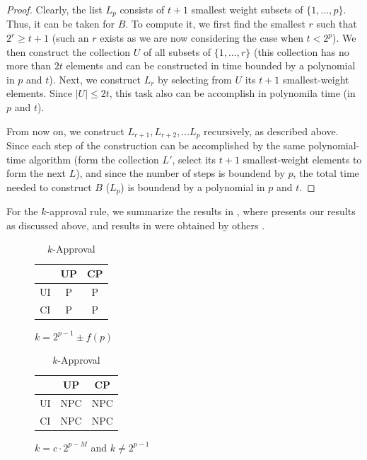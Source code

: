 \begin{proof}
Clearly, the list $L_p$ consists of $t+1$ smallest weight subsets of
$\{1,\ldots,p\}$. Thus, it can be taken for $B$. To compute it, we first
find the smallest $r$ such that $2^r\geq t+1$ (such an $r$ exists as
we are now considering the case when $t < 2^p$). We then construct the 
collection $U$ of all subsets of $\{1,\ldots, r\}$ (this collection 
has no more than $2t$ elements and can be constructed in time bounded 
by a polynomial in $p$ and $t$). Next, we construct $L_r$ by selecting 
from $U$ its $t+1$ smallest-weight elements. Since $|U|\leq 2t$, this task
also can be accomplish in polynomila time (in $p$ and $t$).

From now on, we construct $L_{r+1},L_{r+2},\ldots L_p$ recursively, as 
described above. Since each step of the construction can be accomplished
by the same polynomial-time algorithm (form the collection $L'$, select
its $t+1$ smallest-weight elements to form the next $L$), and since
the number of steps is boundend by $p$, the total time needed to construct
$B$ ($L_p$) is boundend by a polynomial in $p$ and $t$.  
\end{proof}


For the $k$-approval rule, we summarize the results in ,
where  presents our results as discussed above,
and results in  were obtained by others
\cite{lang:aggLP}.
\begin{table}
	\centering
  \begin{subfigure}[b]{0.5\textwidth}
		\centering
		\begin{tabular}[0.5\textwidth]{ | c | c | c | }
		  \hline
		    & UP & CP \\
		  \hline
		  UI & P & P \\
		  \hline
		  CI & P & P \\
		  \hline
		\end{tabular}
		\caption{$k=2^{p-1}\pm f(p)$}
		\label{tbl:kApp_comp_a}
	\end{subfigure}%
  \begin{subfigure}[b]{0.5\textwidth}
		\centering
		\begin{tabular}[0.5\textwidth]{ | c | c | c | }
		  \hline
		    & UP & CP \\
		  \hline
		  UI & NPC & NPC \\
		  \hline
		  CI & NPC & NPC \\
		  \hline
		\end{tabular}
		\caption{$k=c\cdot 2^{p-M}$ and $k \not = 2^{p-1}$}
		\label{tbl:kApp_comp_b}
	\end{subfigure}
	\caption{$k$-Approval}
	\label{tbl:kApp_comp}
\end{table}


